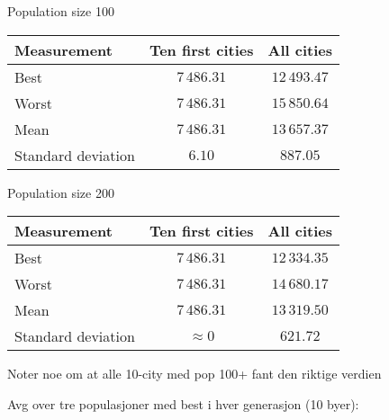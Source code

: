 \documentclass{article}
\begin{document}
Population size 100

\begin{center}
\begin{tabular}{lcc}
\toprule
Measurement & Ten first cities & All cities \\
\midrule
Best & $7\,486.31$ & $12\,493.47$ \\
Worst & $7\,486.31$ & $15\,850.64$ \\
Mean & $7\,486.31$ & $13\,657.37$ \\
Standard deviation & $6.10$ & $887.05$ \\
\bottomrule
\end{tabular}
\end{center}

Population size 200

\begin{center}
\begin{tabular}{lcc}
\toprule
Measurement & Ten first cities & All cities \\
\midrule
Best & $7\,486.31$ & $12\,334.35$ \\
Worst & $7\,486.31$ & $14\,680.17$ \\
Mean & $7\,486.31$ & $13\,319.50$ \\
Standard deviation & $\approx 0$ & $621.72$ \\
\bottomrule
\end{tabular}
\end{center}


Noter noe om at alle 10-city med pop 100+ fant den riktige verdien

Avg over tre populasjoner med best i hver generasjon (10 byer):
\end{document}
